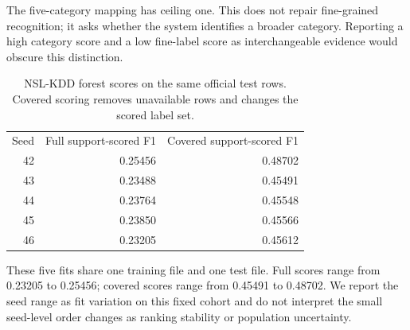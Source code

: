 \documentclass[namedate,webpdf,contemporary,large]{TBench-template}
\begin{document}
The five-category mapping has ceiling one. This does not repair fine-grained recognition; it asks whether the system identifies a broader category. Reporting a high category score and a low fine-label score as interchangeable evidence would obscure this distinction.

\begin{table}[h]\centering
\caption{NSL-KDD forest scores on the same official test rows. Covered scoring removes unavailable rows and changes the scored label set.}
\begin{tabular}{rrr}
Seed & Full support-scored F1 & Covered support-scored F1\\
42 & 0.25456 & 0.48702\\
43 & 0.23488 & 0.45491\\
44 & 0.23764 & 0.45548\\
45 & 0.23850 & 0.45566\\
46 & 0.23205 & 0.45612\\
\end{tabular}\end{table}
These five fits share one training file and one test file. Full scores range from 0.23205 to 0.25456; covered scores range from 0.45491 to 0.48702. We report the seed range as fit variation on this fixed cohort and do not interpret the small seed-level order changes as ranking stability or population uncertainty.
\end{document}
